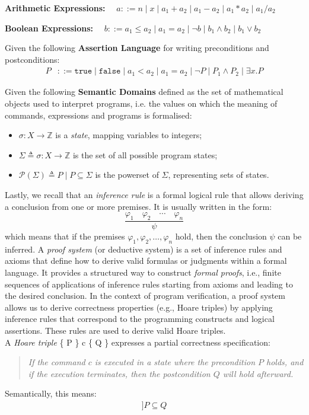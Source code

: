 \documentclass[parskip=half]{scrartcl}
\begin{document}
\textbf{Arithmetic Expressions:} $\quad a ::= n \mid x \mid a_1 + a_2 \mid a_1 - a_2 \mid a_1 * a_2 \mid a_1 / a_2$

\textbf{Boolean Expressions:} $\quad b ::= a_1 \leq a_2 \mid a_1 = a_2 \mid \neg b \mid b_1 \wedge b_2 \mid b_1 \vee b_2$


Given the following \textbf{Assertion Language} for writing preconditions and postconditions:
\begin{align*}
P &::= \texttt{true} \mid \texttt{false} \mid a_1 < a_2 \mid a_1 = a_2 \mid \neg P \mid P_1 \wedge P_2 \mid \exists x . P
\end{align*}

Given the following \textbf{Semantic Domains} defined as the set of mathematical objects used to interpret programs, i.e. the values on which the meaning of commands, expressions and programs is formalised: 
\begin{itemize}
\item $\sigma : X \rightarrow \mathbb{Z}$ is a \emph{state}, mapping variables to integers;
\item $\Sigma \triangleq {\sigma : X \rightarrow \mathbb{Z}}$ is the set of all possible program states;
\item $\mathcal{P}(\Sigma) \triangleq {P \mid P \subseteq \Sigma}$ is the powerset of $\Sigma$, representing sets of states.
\end{itemize}

Lastly, we recall that an \emph{inference rule} is a formal logical rule that allows deriving a conclusion from one or more premises. It is usually written in the form:
\[
\frac{\varphi_1 \quad \varphi_2 \quad \cdots \quad \varphi_n}{\psi}
\]
which means that if the premises $\varphi_1, \varphi_2, \ldots, \varphi_n$ hold, then the conclusion $\psi$ can be inferred.
A \emph{proof system} (or deductive system) is a set of inference rules and axioms that define how to derive valid formulas or judgments within a formal language. It provides a structured way to construct \emph{formal proofs}, i.e., finite sequences of applications of inference rules starting from axioms and leading to the desired conclusion.
In the context of program verification, a proof system allows us to derive correctness properties (e.g., Hoare triples) by applying inference rules that correspond to the programming constructs and logical assertions.
These rules are used to derive valid Hoare triples.
\\ A \emph{Hoare triple} \{ P \} c \{ Q \} expresses a partial correctness specification:
\begin{quote}
\emph{If the command $c$ is executed in a state where the precondition $P$ holds, and if the execution terminates, then the postcondition $Q$ will hold afterward.}
\end{quote}
Semantically, this means:
\begin{align*}
[[c]]P \subseteq Q
\end{align*}
\end{document}
